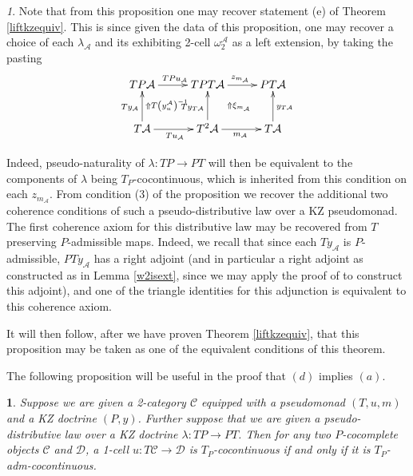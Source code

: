 \documentclass[a4paper,oneside,english]{amsart}
\numberwithin{equation}{section}
\numberwithin{figure}{section}
\theoremstyle{plain}
\theoremstyle{definition}
\theoremstyle{remark}
\newtheorem{rem}[thm]{\protect\remarkname}
\theoremstyle{definition}
\theoremstyle{plain}
\newtheorem{prop}[thm]{\protect\propositionname}
\theoremstyle{plain}
\theoremstyle{plain}
\providecommand{\propositionname}{Proposition}
\providecommand{\remarkname}{Remark}
\begin{document}
\begin{rem}
Note that from this proposition one may recover statement (e) of Theorem
\ref{liftkzequiv}. This is since given the data of this proposition,
one may recover a choice of each $\lambda_{\mathcal{A}}$ and its
exhibiting 2-cell $\omega_{2}^{\mathcal{A}}$ as a left extension,
by taking the pasting
\[
\xymatrix@=1em{TP\mathcal{A}\ar[rr]^{TPu_{\mathcal{A}}}\ar@{}[ddrr]|-{\Uparrow T\left(y_{u}^{\mathcal{A}}\right)^{-1}\quad} &  & TPT\mathcal{A}\ar[rr]^{z_{m_{\mathcal{A}}}}\ar@{}[ddrr]|-{\Uparrow\xi_{m_{\mathcal{A}}}} &  & PT\mathcal{A}\\
\\
T\mathcal{A}\ar[uu]^{Ty_{\mathcal{A}}}\ar[rr]_{Tu_{\mathcal{A}}} &  & T^{2}\mathcal{A}\ar[uu]^{Ty_{T\mathcal{A}}}\ar[rr]_{m_{\mathcal{A}}} &  & T\mathcal{A}\ar[uu]_{y_{T\mathcal{A}}}
}
\]

Indeed, pseudo-naturality of $\lambda\colon TP\to PT$ will then be
equivalent to the components of $\lambda$ being $T_{P}$-cocontinuous,
which is inherited from this condition on each $z_{m_{\mathcal{A}}}$.
From condition (3) of the proposition we recover the additional two
coherence conditions of such a pseudo-distributive law over a KZ pseudomonad.
The first coherence axiom for this distributive law may be recovered
from $T$ preserving $P$-admissible maps. Indeed, we recall that
since each $Ty_{\mathcal{A}}$ is $P$-admissible, $PTy_{\mathcal{A}}$
has a right adjoint (and in particular a right adjoint as constructed
as in Lemma \ref{w2isext}, since we may apply the proof of \cite[Prop. 15]{yonedakz}
to construct this adjoint), and one of the triangle identities for
this adjunction is equivalent to this coherence axiom.

It will then follow, after we have proven Theorem \ref{liftkzequiv},
that this proposition may be taken as one of the equivalent conditions
of this theorem.
\end{rem}
The following proposition will be useful in the proof that $\left(d\right)$
implies $\left(a\right)$.
\begin{prop}
\label{admcocontinuousequiv}Suppose we are given a 2-category $\mathscr{C}$
equipped with a pseudomonad $\left(T,u,m\right)$ and a KZ doctrine
$\left(P,y\right)$. Further suppose that we are given a pseudo-distributive
law over a KZ doctrine $\lambda\colon TP\to PT$. Then for any two
$P$-cocomplete objects $\mathcal{C}$ and $\mathcal{D}$, a 1-cell
$u\colon T\mathcal{C}\to\mathcal{D}$ is $T_{P}$-cocontinuous if
and only if it is $T_{P}$-adm-cocontinuous. \end{prop}
\end{document}

